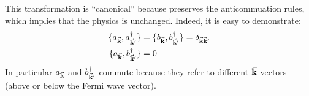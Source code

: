 \documentclass[../main/main.tex]{subfiles}
\begin{document}
\begin{remark}
This transformation is “canonical” because preserves the anticommuation rules, which implies that the physics is unchanged. Indeed, it is easy to demonstrate:
\begin{equation*}
\begin{split}
  \{ a_{\va{k}} , a_{\va{k}'}^\dag  \} &=  \{ b_{\va{k}} ,b_{\va{k}'}^\dag  \} = \delta _{\va{k}\va{k}'} \\
  \{ a_{\va{k}} ,  b_{\va{k}'}^\dag  \} &= 0
\end{split}
\end{equation*}
In particular \( a_{\va{k}}  \) and \(  b_{\va{k}'}^\dag \) commute because they refer to different \( \va{k} \) vectors (above or below the Fermi wave vector).
\end{remark}
\end{document}
